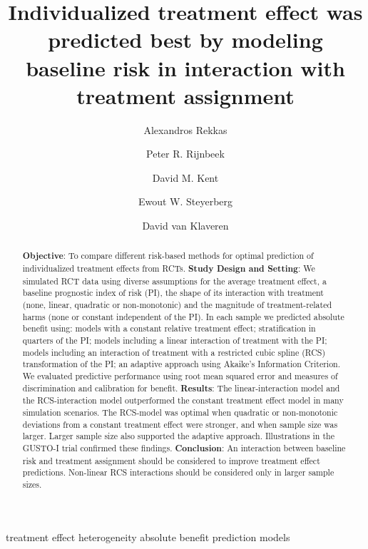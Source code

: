 \documentclass[]{elsarticle} %
\date{}
\begin{document}
\begin{frontmatter}

  \title{Individualized treatment effect was predicted best by modeling
baseline risk in interaction with treatment assignment}
    \author[1]{Alexandros Rekkas}
  
    \author[1]{Peter R. Rijnbeek}
  
    \author[2]{David M. Kent}
  
    \author[3]{Ewout W. Steyerberg}
  
    \author[4]{David van Klaveren}
  
      \address[1]{Department of Medical Informatics, Erasmus Medical
Center, Rotterdam, The Netherlands}
    \address[2]{Predictive Analytics and Comparative Effectiveness
Center, Institute for Clinical Research and Health Policy Studies, Tufts
Medical Center, Boston, Massachusetts, USA}
    \address[3]{Department of Biomedical Data Sciences, Leiden
University Medical Center, Leiden, The Netherlands}
    \address[4]{Department of Public Health, Erasmus Medical Center,
Rotterdam, The Netherlands}
    
  \begin{abstract}
  \textbf{Objective}: To compare different risk-based methods for
  optimal prediction of individualized treatment effects from RCTs.
  \textbf{Study Design and Setting}: We simulated RCT data using diverse
  assumptions for the average treatment effect, a baseline prognostic
  index of risk (PI), the shape of its interaction with treatment (none,
  linear, quadratic or non-monotonic) and the magnitude of
  treatment-related harms (none or constant independent of the PI). In
  each sample we predicted absolute benefit using: models with a
  constant relative treatment effect; stratification in quarters of the
  PI; models including a linear interaction of treatment with the PI;
  models including an interaction of treatment with a restricted cubic
  spline (RCS) transformation of the PI; an adaptive approach using
  Akaike's Information Criterion. We evaluated predictive performance
  using root mean squared error and measures of discrimination and
  calibration for benefit. \textbf{Results}: The linear-interaction
  model and the RCS-interaction model outperformed the constant
  treatment effect model in many simulation scenarios. The RCS-model was
  optimal when quadratic or non-monotonic deviations from a constant
  treatment effect were stronger, and when sample size was larger.
  Larger sample size also supported the adaptive approach. Illustrations
  in the GUSTO-I trial confirmed these findings. \textbf{Conclusion}: An
  interaction between baseline risk and treatment assignment should be
  considered to improve treatment effect predictions. Non-linear RCS
  interactions should be considered only in larger sample sizes.
  \end{abstract}
   \begin{keyword} treatment effect heterogeneity absolute
benefit prediction models\end{keyword}
 \end{frontmatter}
\end{document}
